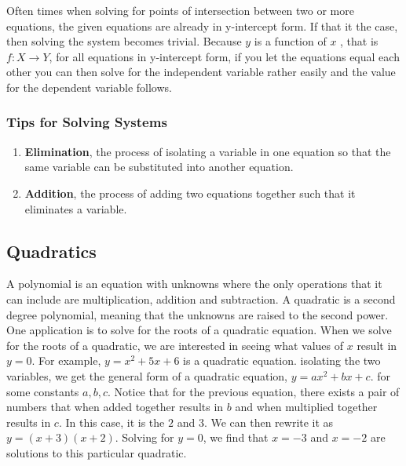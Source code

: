 \documentclass[12pt]{report}
\begin{document}
Often times when solving for points of intersection between two or more equations, the given equations are already in y-intercept form. If that it the case, then solving the system becomes trivial. Because $y$ is a function of $x$ , that is $f: X \rightarrow Y$, for all equations in y-intercept form, if you let the equations equal each other you can then solve for the independent variable rather easily and the value for the dependent variable follows.

\subsubsection{Tips for Solving Systems}
\begin{enumerate}
    \item \textbf{Elimination}, the process of isolating a variable in one equation so that the same variable can be substituted into another equation.
    \item \textbf{Addition}, the process of adding two equations together such that it eliminates a variable.
\end{enumerate}


\subsection{Quadratics}

\hspace{\parindent}A polynomial is an equation with unknowns where the only operations that it can include are multiplication, addition and subtraction.
A quadratic is a second degree polynomial, meaning  that the unknowns are raised to the second power. One application is to solve for the roots of a quadratic equation. When we solve for the roots of a quadratic, we are interested in seeing what values of $x$ result in $y=0$. For example, $y=x^2+5x+6$ is a quadratic equation.
isolating the two variables, we get the general form of a quadratic equation, $y=ax^2+bx+c$. for some constants $a, b, c$. Notice that for the previous equation, there exists a pair of numbers that when added together results in $b$ and when multiplied together results in $c$. In this case, it is the $2$ and $3$. We can then rewrite it as $y=(x+3)(x+2)$. Solving for $y=0$, we find that $x=-3$ and $x=-2$ are solutions to this particular quadratic.

\end{document}
